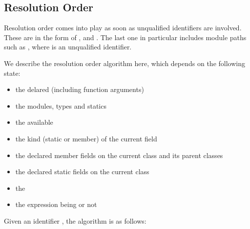 \documentclass{haxe}
\begin{document}
\subsection{Resolution Order}
\label{type-systemresolution-order}

Resolution order comes into play as soon as unqualified identifiers are involved. These are  in the form of ,  and . The last one in particular includes module paths such as , where  is an unqualified identifier.  

We describe the resolution order algorithm here, which depends on the following state:

\begin{itemize}
	\item the delared  (including function arguments)
	\item the  modules, types and statics
	\item the available 
	\item the kind (static or member) of the current field
	\item the declared member fields on the current class and its parent classes
	\item the declared static fields on the current class
	\item the 
	\item the expression being  or not
\end{itemize}

Given an identifier , the algorithm is as follows:
\end{document}
